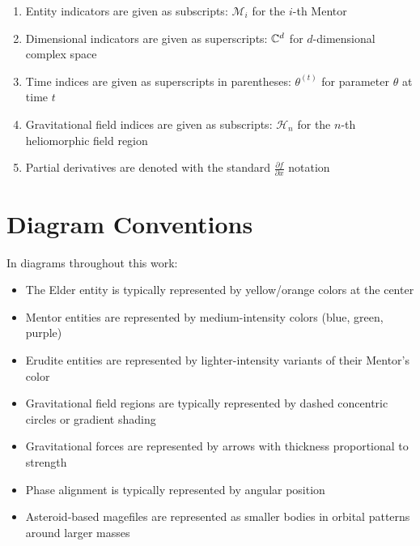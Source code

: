 \begin{enumerate}
    \item Entity indicators are given as subscripts: $\mathcal{M}_i$ for the $i$-th Mentor
    \item Dimensional indicators are given as superscripts: $\mathbb{C}^{d}$ for $d$-dimensional complex space
    \item Time indices are given as superscripts in parentheses: $\theta^{(t)}$ for parameter $\theta$ at time $t$
    \item Gravitational field indices are given as subscripts: $\mathcal{H}_n$ for the $n$-th heliomorphic field region
    \item Partial derivatives are denoted with the standard $\frac{\partial f}{\partial x}$ notation
\end{enumerate}

\section*{Diagram Conventions}

In diagrams throughout this work:

\begin{itemize}
    \item The Elder entity is typically represented by yellow/orange colors at the center
    \item Mentor entities are represented by medium-intensity colors (blue, green, purple)
    \item Erudite entities are represented by lighter-intensity variants of their Mentor's color
    \item Gravitational field regions are typically represented by dashed concentric circles or gradient shading
    \item Gravitational forces are represented by arrows with thickness proportional to strength
    \item Phase alignment is typically represented by angular position
    \item Asteroid-based magefiles are represented as smaller bodies in orbital patterns around larger masses
\end{itemize}